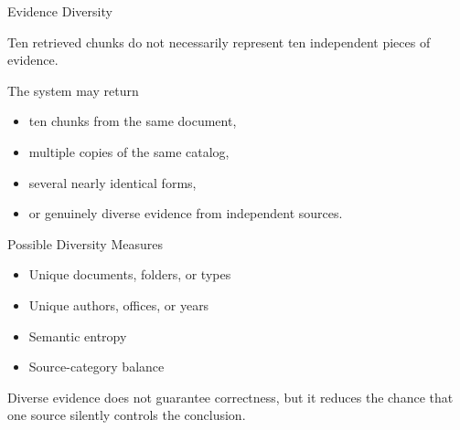\documentclass[aspectratio=169]{beamer}
\begin{document}

\begin{frame}{Evidence Diversity}


Ten retrieved chunks do not necessarily represent ten independent
pieces of evidence.

\vspace{0.10cm}

The system may return

\begin{itemize}
\item ten chunks from the same document,
\item multiple copies of the same catalog,
\item several nearly identical forms,
\item or genuinely diverse evidence from independent sources.
\end{itemize}

\vspace{0.10cm}

\begin{block}{Possible Diversity Measures}

\begin{itemize}
\item Unique documents, folders, or types
\item Unique authors, offices, or years
\item Semantic entropy
\item Source-category balance
\end{itemize}

\end{block}

\vspace{0.10cm}

Diverse evidence does not guarantee correctness, but it reduces the
chance that one source silently controls the conclusion.

\end{frame}

\end{document}
